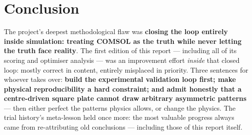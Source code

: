 \documentclass[11pt,a4paper]{article}
\begin{document}
\section{Conclusion}

The project's deepest methodological flaw was \textbf{closing the loop entirely inside simulation: treating COMSOL as the truth while never letting the truth face reality}. The first edition of this report --- including all of its scoring and optimiser analysis --- was an improvement effort \emph{inside} that closed loop: mostly correct in content, entirely misplaced in priority. Three sentences for whoever takes over: \textbf{build the experimental validation loop first; make physical reproducibility a hard constraint; and admit honestly that a centre-driven square plate cannot draw arbitrary asymmetric patterns} --- then either perfect the patterns physics allows, or change the physics. The trial history's meta-lesson held once more: the most valuable progress always came from re-attributing old conclusions --- including those of this report itself.
\end{document}
